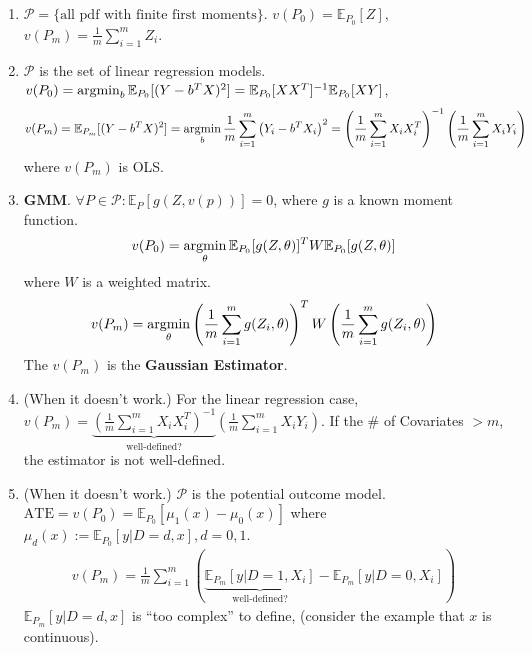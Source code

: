 \documentclass[11pt]{elegantbook}
\newcommand{\argmin}{\operatornamewithlimits{argmin}}
\begin{document}
\begin{example}
    \begin{enumerate}
        \item $\mathcal{P}=\{\text{all pdf with finite first moments}\}$. $v(P_0)=\mathbb{E}_{P_0}[Z]$, $v(P_m)=\frac{1}{m}\sum_{i=1}^m Z_i$.
        \item $\mathcal{P}$ is the set of linear regression models. $v(P_0)=\argmin_b \mathbb{E}_{P_0}[(Y-b^TX)^2]=\mathbb{E}_{P_0}[XX^T]^{-1}\mathbb{E}_{P_0}[XY]$,
        \begin{equation}
            \begin{aligned}
                v(P_m)=\mathbb{E}_{P_m}[(Y-b^TX)^2]=\argmin_b\frac{1}{m}\sum_{i=1}^m\left(Y_i-b^TX_i\right)^2=\left(\frac{1}{m}\sum_{i=1}^mX_iX_i^T\right)^{-1}\left(\frac{1}{m}\sum_{i=1}^mX_iY_i\right)
            \end{aligned}
            \nonumber
        \end{equation}
        where $v(P_m)$ is OLS.
        \item \textbf{GMM}. $\forall P\in \mathcal{P}: \mathbb{E}_P[g(Z,v(p))]=0$, where $g$ is a known moment function. $$v(P_0)=\argmin_\theta \mathbb{E}_{P_0}[g(Z,\theta)]^TW\mathbb{E}_{P_0}[g(Z,\theta)]$$
        where $W$ is a weighted matrix.
        \begin{equation}
            \begin{aligned}
                v(P_m)=\argmin_\theta \left(\frac{1}{m}\sum_{i=1}^m g(Z_i,\theta)\right)^TW\left(\frac{1}{m}\sum_{i=1}^m g(Z_i,\theta)\right)
            \end{aligned}
            \nonumber
        \end{equation}
        The $v(P_m)$ is the \textbf{Gaussian Estimator}.
        \item (When it doesn't work.) For the linear regression case, $v(P_m)=\underbrace{\left(\frac{1}{m}\sum_{i=1}^mX_iX_i^T\right)^{-1}}_\text{well-defined?}\left(\frac{1}{m}\sum_{i=1}^mX_iY_i\right)$. If the $\#$ of Covariates $> m$, the estimator is not well-defined.
        \item (When it doesn't work.) $\mathcal{P}$ is the potential outcome model. $\text{ATE}=v(P_0)=\mathbb{E}_{P_0}[\mu_1(x)-\mu_0(x)]$ where $\mu_d(x):=\mathbb{E}_{P_0}[y|D=d,x],d=0,1$.
        \begin{equation}
            \begin{aligned}
                v(P_m)=\frac{1}{m}\sum_{i=1}^m\left(\underbrace{\mathbb{E}_{P_m}[y|D=1,X_i]}_\text{well-defined?}-\mathbb{E}_{P_m}[y|D=0,X_i]\right)
            \end{aligned}
            \nonumber
        \end{equation}
        $\mathbb{E}_{P_m}[y|D=d,x]$ is ``too complex'' to define, (consider the example that $x$ is continuous).
    \end{enumerate}
\end{example}
\end{document}
